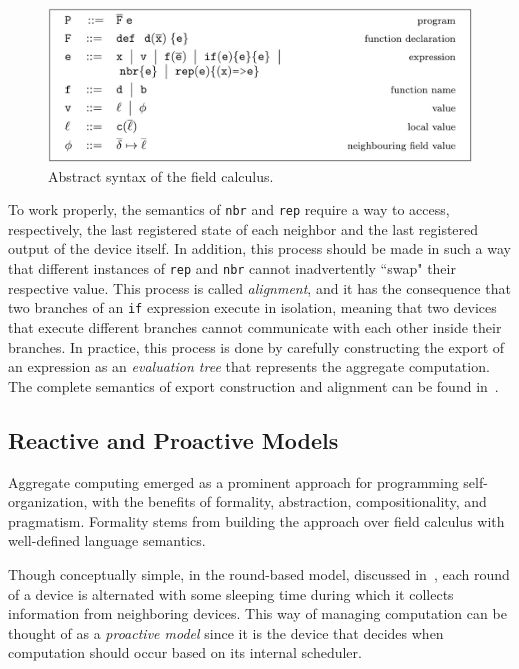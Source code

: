 \begin{figure}
    \centering
    \includegraphics[width=\linewidth]{figures/field-calculus-syntax.jpg}
    \caption{Abstract syntax of the field calculus.}
    \label{fig:field-calculus-syntax}
\end{figure}

To work properly, the semantics of \texttt{nbr} and \texttt{rep} require a way to access, respectively, the last registered state of each neighbor and the last registered output of the device itself. In addition, this process should be made in such a way that different instances of \texttt{rep} and \texttt{nbr} cannot inadvertently ``swap" their respective value. This process is called \textit{alignment}, and it has the consequence that two branches of an \texttt{if} expression execute in isolation, meaning that two devices that execute different branches cannot communicate with each other inside their branches. In practice, this process is done by carefully constructing the export of an expression as an \textit{evaluation tree} that represents the aggregate computation. The complete semantics of export construction and alignment can be found in~\cite{Viroli2018}.

\subsection{Reactive and Proactive Models}
\label{subsection:reactive-and-proactive-models}

Aggregate computing emerged as a prominent approach for programming self-organization, with the benefits of formality, abstraction, compositionality, and pragmatism. Formality stems from building the approach over field calculus with well-defined language semantics.

Though conceptually simple, in the round-based model, discussed in~\cite{Viroli2018}, each round of a device is alternated with some sleeping time during which it collects information from neighboring devices. This way of managing computation can be thought of as a \textit{proactive model} since it is the device that decides when computation should occur based on its internal scheduler.

